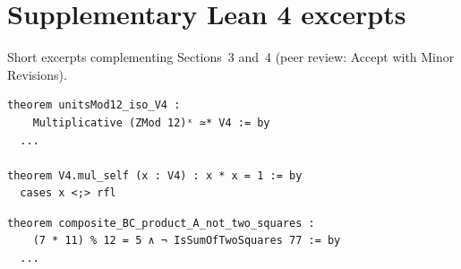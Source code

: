 \documentclass[11pt,a4paper]{article}
\theoremstyle{definition}
\begin{document}
	\appendix
	\section{Supplementary Lean 4 excerpts}
	Short excerpts complementing Sections~3 and~4 (peer review: Accept with Minor Revisions).

	\begin{lstlisting}[caption={Isomorphism and exponent-2 law}]
theorem unitsMod12_iso_V4 :
    Multiplicative (ZMod 12)ˣ ≃* V4 := by
  ...

theorem V4.mul_self (x : V4) : x * x = 1 := by
  cases x <;> rfl
	\end{lstlisting}

	\begin{lstlisting}[caption={Semiprime $B\cdot C\to A$ without two-square representation}]
theorem composite_BC_product_A_not_two_squares :
    (7 * 11) % 12 = 5 ∧ ¬ IsSumOfTwoSquares 77 := by
  ...
	\end{lstlisting}
\end{document}
